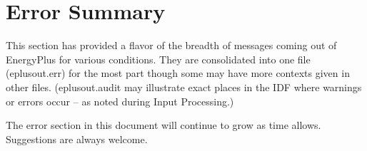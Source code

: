 \section{Error Summary}\label{error-summary}

This section has provided a flavor of the breadth of messages coming out of EnergyPlus for various conditions. They are consolidated into one file (eplusout.err) for the most part though some may have more contexts given in other files. (eplusout.audit may illustrate exact places in the IDF where warnings or errors occur -- as noted during Input Processing.)

The error section in this document will continue to grow as time allows. Suggestions are always welcome.
